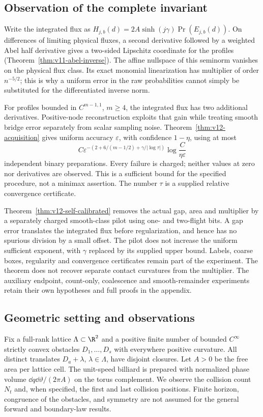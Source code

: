 \subsection{Observation of the complete invariant}
Write the integrated flux as
$H_{j,b}(d)=2A\sinh(j\gamma)\Pr(E_{j,b}(d))$.
On differences of limiting physical fluxes, a second derivative
followed by a weighted Abel half derivative gives a two-sided Lipschitz
coordinate for the profiles (Theorem~\ref{thm:v11-abel-inverse}).
The affine nullspace of this seminorm vanishes on the physical
flux class. Its exact monomial linearization has multiplier of order
$n^{-5/2}$; this is why a uniform error in the raw probabilities
cannot simply be substituted for the differentiated inverse norm.

For profiles bounded in $C^{m-1,1}$, $m\ge4$, the integrated flux
has two additional derivatives. Positive-node reconstruction exploits
that gain while treating smooth bridge error separately from scalar
sampling noise. Theorem~\ref{thm:v12-acquisition} gives uniform
accuracy $\varepsilon$, with confidence $1-\eta$, using at most
\[
 C\varepsilon^{-\left(2+6/(m-1/2)+\gamma/|\log\tau|\right)}
                       \log\frac{C}{\eta\varepsilon}
\]
independent binary preparations. Every failure is charged; neither
values at zero nor derivatives are observed. This is a sufficient
bound for the specified procedure, not a minimax assertion. The
number $\tau$ is a supplied relative convergence certificate.

Theorem~\ref{thm:v12-self-calibrated} removes the actual gap, area
and multiplier by a separately charged smooth-class pilot using one-
and two-flight bits. A gap error translates the integrated flux before
regularization, and hence has no spurious division by a small offset.
The pilot does not increase the uniform sufficient exponent, with
$\gamma$ replaced by its supplied upper bound. Labels, coarse boxes,
regularity and convergence certificates remain part of the experiment.
The theorem does not recover separate contact curvatures from the
multiplier. The auxiliary endpoint, count-only, coalescence and
smooth-remainder experiments retain their own hypotheses and full
proofs in the appendix.

\subsection{Geometric setting and observations}
Fix a full-rank lattice $\Lambda\subset\R^2$ and a positive finite number of bounded
$C^\infty$ strictly convex obstacles $D_1,\ldots,D_s$ with everywhere
positive curvature. All distinct translates $D_a+\lambda$, $\lambda\in
\Lambda$, have disjoint closures. Let $A>0$ be the free area per lattice
cell. The unit-speed billiard is prepared with normalized phase volume
$\dd q\dd\vartheta/(2\pi A)$ on the torus complement. We observe the
collision count $N_t$ and, when specified, the first and last collision
positions. Finite horizon, congruence of the obstacles, and symmetry
are not assumed for the general forward and boundary-law results.

